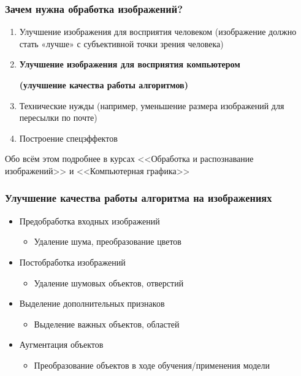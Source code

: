 \documentclass[fleqn, xcolor=x11names]{beamer}
\begin{document}
\begin{frame}[fragile]\frametitle{Зачем нужна обработка изображений?}
\begin{enumerate}
\item Улучшение изображения для восприятия человеком
(изображение должно стать «лучше» с субъективной точки зрения
человека)
\item \textbf{Улучшение изображения для восприятия компьютером}

\textbf{(улучшение качества работы алгоритмов)}

\item Технические нужды (например, уменьшение размера изображений для пересылки по почте)

\item Построение спецэффектов
\end{enumerate}

\hfill

Обо всём этом подробнее в курсах <<Обработка и распознавание изображений>> и <<Компьютерная графика>>

\end{frame}

\begin{frame}[fragile]\frametitle{Улучшение качества работы алгоритма на изображениях}

\begin{itemize}
\item Предобработка входных изображений

\begin{itemize}
\item Удаление шума, преобразование цветов
\end{itemize}

\item Постобработка изображений

\begin{itemize}
	\item Удаление шумовых объектов, отверстий
\end{itemize}

\item Выделение дополнительных признаков

\begin{itemize}
\item Выделение важных объектов, областей
\end{itemize}
%
%

\item Аугментация объектов

\begin{itemize}
\item Преобразование объектов в ходе обучения/применения модели

\end{itemize}

\end{itemize}
\end{frame}
\end{document}
